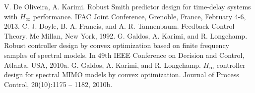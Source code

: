 \documentclass[A4, 10pt, conference]{ieeeconf}
\begin{document}


\iffalse

\begin{thebibliography}{99.}%
%
%
%
 V. De Oliveira, A. Karimi. Robust Smith predictor design for time-delay systems with $H_\infty$ performance.  IFAC Joint Conference, Grenoble, France, February 4-6, 2013.
%
%
 C. J. Doyle, B. A. Francis, and A. R. Tannenbaum.
Feedback Control Theory. Mc Millan, New York, 1992.
%
 G. Galdos, A. Karimi, and R. Longchamp. Robust controller
design by convex optimization based on finite
frequency samples of spectral models. In 49th IEEE
Conference on Decision and Control, Atlanta, USA,
2010a.
%
 G. Galdos, A. Karimi, and R. Longchamp. $H_{\infty}$ controller
design for spectral MIMO models by convex optimization.
Journal of Process Control, 20(10):1175 – 1182,
2010b.
%
%
%

\end{thebibliography}
\end{document}
